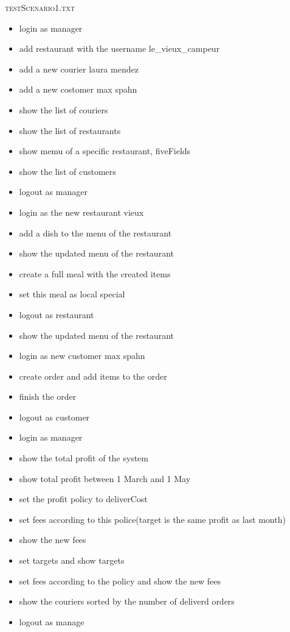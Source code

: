 \textsc{testScenario1.txt}
\begin{itemize}[itemsep=0mm]
	\item login as manager
	\item add restaurant with the username le\_vieux\_campeur
	\item add a new courier laura mendez
	\item add a new costomer max spahn
	\item show the list of couriers
	\item show the list of restaurants
	\item show memu of a specific restaurant, fiveFields
	\item show the list of customers 
	\item logout as manager
	\item login as the new restaurant vieux
	\item add a dish to the menu of the restaurant
	\item show the updated menu of the restaurant
	\item create a full meal with the created items
	\item set this meal as local special
	\item logout as restaurant
	\item show the updated menu of the restaurant
	\item login as new customer max spahn
	\item create order and add items to the order
	\item finish the order
	\item logout as customer
	\item login as manager
	\item show the total profit of the system 
	\item show total profit between 1 March and 1 May
	\item set the profit policy to deliverCost
	\item set fees according to this police(target is the same profit as last month) 
	\item show the new fees
	\item set targets and show targets
	\item set fees according to the policy and show the new fees
        \item show the couriers sorted by the number of deliverd orders
        \item logout as manage
\end{itemize}

